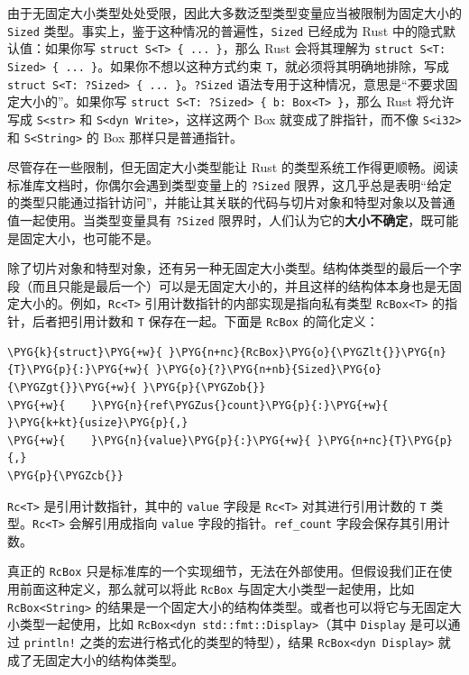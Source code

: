 由于无固定大小类型处处受限，因此大多数泛型类型变量应当被限制为固定大小的 \texttt{Sized} 类型。事实上，鉴于这种情况的普遍性，\texttt{Sized} 已经成为 Rust 中的隐式默认值：如果你写 \texttt{struct S<T> \{ ... \}}，那么 Rust 会将其理解为 \texttt{struct S<T: Sized> \{ ... \}}。如果你不想以这种方式约束 \texttt{T}，就必须将其明确地排除，写成 \texttt{struct S<T: ?Sized> \{ ... \}}。\texttt{?Sized} 语法专用于这种情况，意思是“不要求固定大小的”。如果你写 \texttt{struct S<T: ?Sized> \{ b: Box<T> \}}，那么 Rust 将允许写成 \texttt{S<str>} 和 \texttt{S<dyn Write>}，这样这两个 Box 就变成了胖指针，而不像 \texttt{S<i32>} 和 \texttt{S<String>} 的 Box 那样只是普通指针。

尽管存在一些限制，但无固定大小类型能让 Rust 的类型系统工作得更顺畅。阅读标准库文档时，你偶尔会遇到类型变量上的 \texttt{?Sized} 限界，这几乎总是表明“给定的类型只能通过指针访问”，并能让其关联的代码与切片对象和特型对象以及普通值一起使用。当类型变量具有 \texttt{?Sized} 限界时，人们认为它的\textbf{大小不确定}，既可能是固定大小，也可能不是。

除了切片对象和特型对象，还有另一种无固定大小类型。结构体类型的最后一个字段（而且只能是最后一个）可以是无固定大小的，并且这样的结构体本身也是无固定大小的。例如，\texttt{Rc<T>} 引用计数指针的内部实现是指向私有类型 \texttt{RcBox<T>} 的指针，后者把引用计数和 \texttt{T} 保存在一起。下面是 \texttt{RcBox} 的简化定义：

\begin{Verbatim}[commandchars=\\\{\},breaklines=true,breakanywhere=true,fontsize=\codefont,xleftmargin=17bp]
\PYG{k}{struct}\PYG{+w}{ }\PYG{n+nc}{RcBox}\PYG{o}{\PYGZlt{}}\PYG{n}{T}\PYG{p}{:}\PYG{+w}{ }\PYG{o}{?}\PYG{n+nb}{Sized}\PYG{o}{\PYGZgt{}}\PYG{+w}{ }\PYG{p}{\PYGZob{}}
\PYG{+w}{    }\PYG{n}{ref\PYGZus{}count}\PYG{p}{:}\PYG{+w}{ }\PYG{k+kt}{usize}\PYG{p}{,}
\PYG{+w}{    }\PYG{n}{value}\PYG{p}{:}\PYG{+w}{ }\PYG{n+nc}{T}\PYG{p}{,}
\PYG{p}{\PYGZcb{}}
\end{Verbatim}

\texttt{Rc<T>} 是引用计数指针，其中的 \texttt{value} 字段是 \texttt{Rc<T>} 对其进行引用计数的 \texttt{T} 类型。\texttt{Rc<T>} 会解引用成指向 \texttt{value} 字段的指针。\texttt{ref\_count} 字段会保存其引用计数。

真正的 \texttt{RcBox} 只是标准库的一个实现细节，无法在外部使用。但假设我们正在使用前面这种定义，那么就可以将此 \texttt{RcBox} 与固定大小类型一起使用，比如 \texttt{RcBox<String>} 的结果是一个固定大小的结构体类型。或者也可以将它与无固定大小类型一起使用，比如 \texttt{RcBox<dyn std::fmt::Display>}（其中 \texttt{Display} 是可以通过 \texttt{println!} 之类的宏进行格式化的类型的特型），结果 \texttt{RcBox<dyn Display>} 就成了无固定大小的结构体类型。


